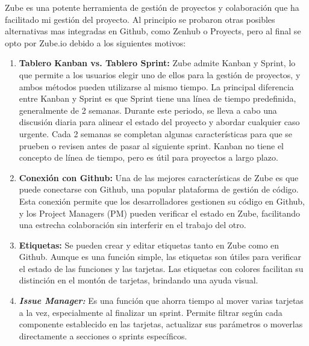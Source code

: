 Zube es una potente herramienta de gestión de proyectos y colaboración que ha facilitado mi gestión del proyecto. Al principio se probaron otras posibles alternativas mas integradas en Github, como Zenhub o Proyects, pero al final se opto por Zube.io debido a los siguientes motivos:
\begin{enumerate}

\item \textbf{Tablero Kanban vs. Tablero Sprint:} Zube admite Kanban y Sprint, lo que permite a los usuarios elegir uno de ellos para la gestión de proyectos, y ambos métodos pueden utilizarse al mismo tiempo. La principal diferencia entre Kanban y Sprint es que Sprint tiene una línea de tiempo predefinida, generalmente de 2 semanas. Durante este periodo, se lleva a cabo una discusión diaria para alinear el estado del proyecto y abordar cualquier caso urgente. Cada 2 semanas se completan algunas características para que se prueben o revisen antes de pasar al siguiente sprint. Kanban no tiene el concepto de línea de tiempo, pero es útil para proyectos a largo plazo.


\item \textbf{Conexión con Github:} Una de las mejores características de Zube es que puede conectarse con Github, una popular plataforma de gestión de código. Esta conexión permite que los desarrolladores gestionen su código en Github, y los Project Managers (PM) pueden verificar el estado en Zube, facilitando una estrecha colaboración sin interferir en el trabajo del otro.

\item \textbf{Etiquetas:} Se pueden crear y editar etiquetas tanto en Zube como en Github. Aunque es una función simple, las etiquetas son útiles para verificar el estado de las funciones y las tarjetas. Las etiquetas con colores facilitan su distinción en el montón de tarjetas, brindando una ayuda visual.

\item \textit{\textbf{Issue Manager:}} Es una función que ahorra tiempo al mover varias tarjetas a la vez, especialmente al finalizar un sprint. Permite filtrar según cada componente establecido en las tarjetas, actualizar sus parámetros o moverlas directamente a secciones o sprints específicos.

\end{enumerate}

